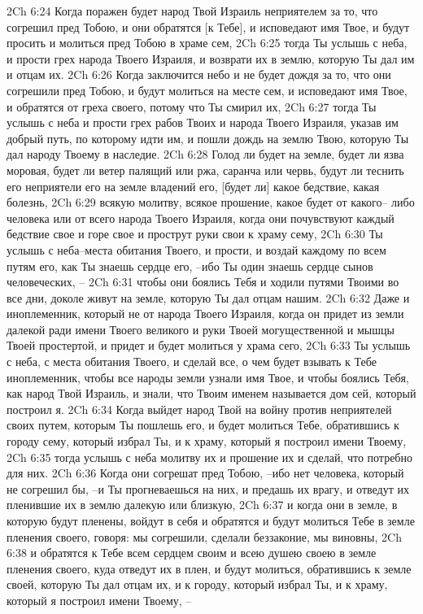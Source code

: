 2Ch 6:24  Когда поражен будет народ Твой Израиль неприятелем за то, что согрешил пред Тобою, и они обратятся [к Тебе], и исповедают имя Твое, и будут просить и молиться пред Тобою в храме сем,
2Ch 6:25  тогда Ты услышь с неба, и прости грех народа Твоего Израиля, и возврати их в землю, которую Ты дал им и отцам их.
2Ch 6:26  Когда заключится небо и не будет дождя за то, что они согрешили пред Тобою, и будут молиться на месте сем, и исповедают имя Твое, и обратятся от греха своего, потому что Ты смирил их,
2Ch 6:27  тогда Ты услышь с неба и прости грех рабов Твоих и народа Твоего Израиля, указав им добрый путь, по которому идти им, и пошли дождь на землю Твою, которую Ты дал народу Твоему в наследие.
2Ch 6:28  Голод ли будет на земле, будет ли язва моровая, будет ли ветер палящий или ржа, саранча или червь, будут ли теснить его неприятели его на земле владений его, [будет ли] какое бедствие, какая болезнь,
2Ch 6:29  всякую молитву, всякое прошение, какое будет от какого-- либо человека или от всего народа Твоего Израиля, когда они почувствуют каждый бедствие свое и горе свое и прострут руки свои к храму сему,
2Ch 6:30  Ты услышь с неба--места обитания Твоего, и прости, и воздай каждому по всем путям его, как Ты знаешь сердце его, --ибо Ты один знаешь сердце сынов человеческих, --
2Ch 6:31  чтобы они боялись Тебя и ходили путями Твоими во все дни, доколе живут на земле, которую Ты дал отцам нашим.
2Ch 6:32  Даже и иноплеменник, который не от народа Твоего Израиля, когда он придет из земли далекой ради имени Твоего великого и руки Твоей могущественной и мышцы Твоей простертой, и придет и будет молиться у храма сего,
2Ch 6:33  Ты услышь с неба, с места обитания Твоего, и сделай все, о чем будет взывать к Тебе иноплеменник, чтобы все народы земли узнали имя Твое, и чтобы боялись Тебя, как народ Твой Израиль, и знали, что Твоим именем называется дом сей, который построил я.
2Ch 6:34  Когда выйдет народ Твой на войну против неприятелей своих путем, которым Ты пошлешь его, и будет молиться Тебе, обратившись к городу сему, который избрал Ты, и к храму, который я построил имени Твоему,
2Ch 6:35  тогда услышь с неба молитву их и прошение их и сделай, что потребно для них.
2Ch 6:36  Когда они согрешат пред Тобою, --ибо нет человека, который не согрешил бы, --и Ты прогневаешься на них, и предашь их врагу, и отведут их пленившие их в землю далекую или близкую,
2Ch 6:37  и когда они в земле, в которую будут пленены, войдут в себя и обратятся и будут молиться Тебе в земле пленения своего, говоря: мы согрешили, сделали беззаконие, мы виновны,
2Ch 6:38  и обратятся к Тебе всем сердцем своим и всею душею своею в земле пленения своего, куда отведут их в плен, и будут молиться, обратившись к земле своей, которую Ты дал отцам их, и к городу, который избрал Ты, и к храму, который я построил имени Твоему, --
